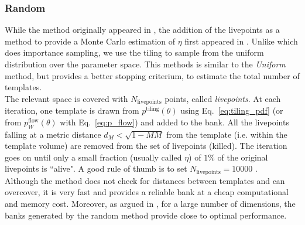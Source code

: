 \documentclass[twocolumn,showpacs,preprintnumbers,nofootinbib,prd,
superscriptaddress,10pt]{revtex4-2}
\begin{document}
\subsubsection{Random}\label{par:random}
While the method originally appeared in \cite{Messenger:2008ta}, the addition of the livepoints as a method to provide a Monte Carlo estimation of $\eta$ first appeared in \cite{Coogan:2022qxs}. Unlike \cite{Coogan:2022qxs} which does importance sampling, we use the tiling to sample from the uniform distribution over the parameter space.
This methods is similar to the {\it Uniform} method, but provides a better stopping criterium, to estimate the total number of templates.
\\
The relevant space is covered with $N_\mathrm{livepoints}$ points, called {\it livepoints}.
At each iteration, one template is drawn from $p^{\text{tiling}}(\theta)$ using Eq.~\eqref{eq:tiling_pdf} (or from $p^{\text{flow}}_W(\theta)$ with Eq.~\eqref{eq:p_flow}) and added to the bank. All the livepoints falling at a metric distance $d_M<\sqrt{1-MM}$ from the template (i.e. within the template volume) are removed from the set of livepoints (killed). The iteration goes on until only a small fraction (usually called $\eta$) of $1\%$ of the original livepoints is ``alive". A good rule of thumb is to set $N_\mathrm{livepoints} = 10000$ \cite{Coogan:2022qxs}.
\\
Although the method does not check for distances between templates and can overcover, it is very fast and provides a reliable bank at a cheap computational and memory cost.
Moreover, as argued in \cite{Messenger:2008ta, Allen:2021yuy, Allen:2022lqr}, for a large number of dimensions, the banks generated by the random method provide close to optimal performance.

\end{document}

